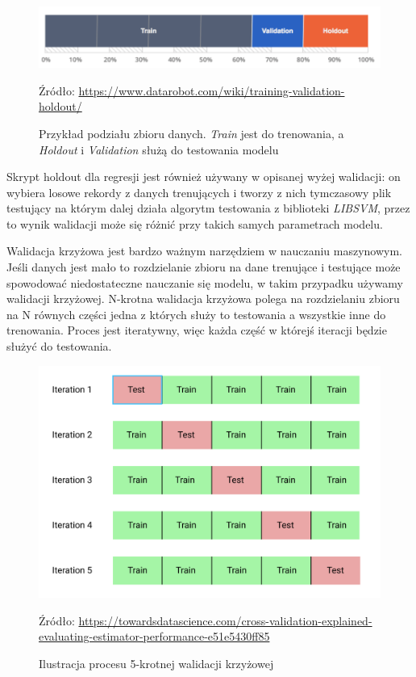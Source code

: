 \documentclass[paper=a4, fontsize=11pt]{scrartcl} %
\numberwithin{equation}{section} %
\numberwithin{figure}{section} %
\newcommand*{\captionsource}[2]{%
  \caption[{#1}]{%
      #1}
    Źródło: #2%
}
\begin{document}
    \begin{figure}[H]
        \begin{center}
            \includegraphics[scale=0.5]{./img/train_validation_holdout.png}
            \captionsource{Przykład podziału zbioru danych. \textit{Train} jest do trenowania,
            a \textit{Holdout} i \textit{Validation} służą do testowania modelu}
            {\url{https://www.datarobot.com/wiki/training-validation-holdout/}}
            \label{fig:tr_val_hl}
        \end{center}
    \end{figure}

    \par Skrypt holdout dla regresji jest również używany w opisanej wyżej walidacji: on
    wybiera losowe rekordy z danych trenujących i tworzy z nich tymczasowy plik testujący na
    którym dalej działa algorytm testowania z biblioteki \textit{LIBSVM}, przez to wynik
    walidacji może się różnić przy takich samych parametrach modelu.

    \par Walidacja krzyżowa jest bardzo ważnym narzędziem w nauczaniu maszynowym. Jeśli danych
    jest mało to rozdzielanie zbioru na dane trenujące i testujące może spowodować
    niedostateczne nauczanie się modelu, w takim przypadku używamy walidacji krzyżowej.
    N-krotna walidacja krzyżowa polega na rozdzielaniu zbioru na N równych części jedna z
    których służy to testowania a wszystkie inne do trenowania. Proces jest iteratywny, więc
    każda część w którejś iteracji będzie służyć do testowania. 

    \begin{figure}[H]
        \begin{center}
            \includegraphics[scale=0.3]{./img/cv_ilustration.png}
            \captionsource{Ilustracja procesu 5-krotnej walidacji krzyżowej}
            {\url{https://towardsdatascience.com/cross-validation-explained-
            evaluating-estimator-performance-e51e5430ff85}}
            \label{fig:cv_ilustr}
        \end{center}
    \end{figure}
\end{document}
